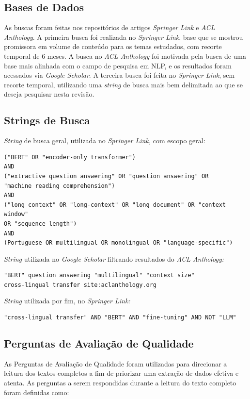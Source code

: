 \documentclass[12pt,a4paper]{article}
\begin{document}
\subsection{Bases de Dados}
As buscas foram feitas nos repositórios de artigos \textit{Springer Link} e \textit{ACL Anthology}. A primeira busca foi realizada no \textit{Springer Link}, base que se mostrou promissora em volume de conteúdo para os temas estudados, com recorte temporal de 6 meses. A busca no \textit{ACL Anthology} foi motivada pela busca de uma base mais alinhada com o campo de pesquisa em NLP, e os resultados foram acessados via \textit{Google Scholar}. A terceira busca foi feita no \textit{Springer Link}, sem recorte temporal, utilizando uma \textit{string} de busca mais bem delimitada ao que se deseja pesquisar nesta revisão.

\subsection{Strings de Busca}
\textit{String} de busca geral, utilizada no \textit{Springer Link,} com escopo geral:

\begin{verbatim}
("BERT" OR "encoder-only transformer")
AND
("extractive question answering" OR "question answering" OR 
"machine reading comprehension")
AND
("long context" OR "long-context" OR "long document" OR "context window" 
OR "sequence length")
AND
(Portuguese OR multilingual OR monolingual OR "language-specific")
\end{verbatim}

\textit{String} utilizada no \textit{Google Scholar} filtrando resultados do \textit{ACL Anthology:}

\begin{verbatim}
"BERT" question answering "multilingual" "context size" 
cross-lingual transfer site:aclanthology.org
\end{verbatim}

\textit{String} utilizada por fim, no \textit{Springer Link:}

\begin{verbatim}
"cross-lingual transfer" AND "BERT" AND "fine-tuning" AND NOT "LLM"
\end{verbatim}

\subsection{Perguntas de Avaliação de Qualidade}
As Perguntas de Avaliação de Qualidade foram utilizadas para direcionar a leitura dos textos completos a fim de priorizar uma extração de dados efetiva e atenta. As perguntas a serem respondidas durante a leitura do texto completo foram definidas como:
\end{document}
